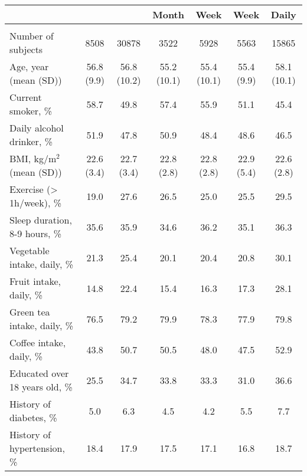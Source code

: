 \documentclass[nutrients,article,submitted,moreauthors,pdftex]{mdpi}
\begin{document}
\begin{table}[h]
{\begin{tabular}[t]{lcccccc}
 &       &         & \textbf{Month}     & \textbf{Week}      & \textbf{Week}         & \textbf{Daily}  \\
\midrule
\rowcolor{gray!6}  \addlinespace[0.3em]
\multicolumn{7}{l}{\textbf{Men (n = 39386)}}\\
\hspace{1em}Number of subjects & 8508 & 30878 & 3522 & 5928 & 5563 & 15865\\
\hspace{1em}Age, year (mean (SD)) & 56.8 (9.9) & 56.8 (10.2) & 55.2 (10.1) & 55.4 (10.1) & 55.4 (9.9) & 58.1 (10.1)\\
\rowcolor{gray!6}  \hspace{1em}Current smoker, \% & 58.7 & 49.8 & 57.4 & 55.9 & 51.1 & 45.4\\
\hspace{1em}Daily alcohol drinker, \% & 51.9 & 47.8 & 50.9 & 48.4 & 48.6 & 46.5\\
\rowcolor{gray!6}  \hspace{1em}BMI, kg/m$^2$ (mean (SD)) & 22.6 (3.4) & 22.7 (3.4) & 22.8 (2.8) & 22.8 (2.8) & 22.9 (5.4) & 22.6 (2.8)\\
\hspace{1em}Exercise (> 1h/week), \% & 19.0 & 27.6 & 26.5 & 25.0 & 25.5 & 29.5\\
\rowcolor{gray!6}  \hspace{1em}Sleep duration, 8-9 hours, \% & 35.6 & 35.9 & 34.6 & 36.2 & 35.1 & 36.3\\
\hspace{1em}Vegetable intake, daily, \% & 21.3 & 25.4 & 20.1 & 20.4 & 20.8 & 30.1\\
\rowcolor{gray!6}  \hspace{1em}Fruit intake, daily, \% & 14.8 & 22.4 & 15.4 & 16.3 & 17.3 & 28.1\\
\hspace{1em}Green tea intake, daily, \% & 76.5 & 79.2 & 79.9 & 78.3 & 77.9 & 79.8\\
\rowcolor{gray!6}  \hspace{1em}Coffee intake, daily, \% & 43.8 & 50.7 & 50.5 & 48.0 & 47.5 & 52.9\\
\hspace{1em}Educated over 18 years old, \% & 25.5 & 34.7 & 33.8 & 33.3 & 31.0 & 36.6\\
\rowcolor{gray!6}  \hspace{1em}History of diabetes, \% & 5.0 & 6.3 & 4.5 & 4.2 & 5.5 & 7.7\\
\hspace{1em}History of hypertension, \% & 18.4 & 17.9 & 17.5 & 17.1 & 16.8 & 18.7\\

\end{tabular}}
\end{table}
\end{document}
